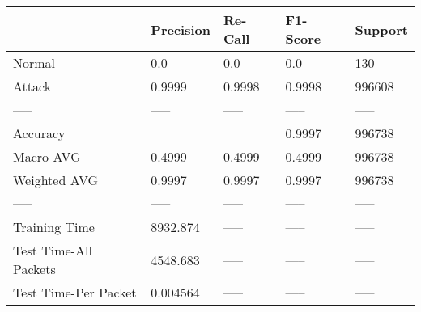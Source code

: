 \begin{tabular}{lllll}
\toprule
{} & Precision & Re-Call & F1-Score & Support \\
\midrule
Normal                &       0.0 &     0.0 &      0.0 &     130 \\
Attack                &    0.9999 &  0.9998 &   0.9998 &  996608 \\
-----                 &     ----- &   ----- &    ----- &   ----- \\
Accuracy              &           &         &   0.9997 &  996738 \\
Macro AVG             &    0.4999 &  0.4999 &   0.4999 &  996738 \\
Weighted AVG          &    0.9997 &  0.9997 &   0.9997 &  996738 \\
-----                 &     ----- &   ----- &    ----- &   ----- \\
Training Time         &  8932.874 &   ----- &    ----- &   ----- \\
Test Time-All Packets &  4548.683 &   ----- &    ----- &   ----- \\
Test Time-Per Packet  &  0.004564 &   ----- &    ----- &   ----- \\
\bottomrule
\end{tabular}
